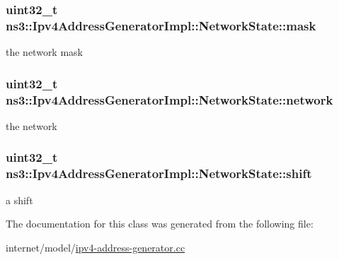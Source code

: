 \subsubsection[{\texorpdfstring{mask}{mask}}]{\setlength{\rightskip}{0pt plus 5cm}uint32\+\_\+t ns3\+::\+Ipv4\+Address\+Generator\+Impl\+::\+Network\+State\+::mask}\hypertarget{classns3_1_1Ipv4AddressGeneratorImpl_1_1NetworkState_af72c61673bc535c22b2dedd6afd21b4d}{}\label{classns3_1_1Ipv4AddressGeneratorImpl_1_1NetworkState_af72c61673bc535c22b2dedd6afd21b4d}


the network mask 

\subsubsection[{\texorpdfstring{network}{network}}]{\setlength{\rightskip}{0pt plus 5cm}uint32\+\_\+t ns3\+::\+Ipv4\+Address\+Generator\+Impl\+::\+Network\+State\+::network}\hypertarget{classns3_1_1Ipv4AddressGeneratorImpl_1_1NetworkState_afe15739547ef60d7ba74c3ab6b83e6f8}{}\label{classns3_1_1Ipv4AddressGeneratorImpl_1_1NetworkState_afe15739547ef60d7ba74c3ab6b83e6f8}


the network 

\subsubsection[{\texorpdfstring{shift}{shift}}]{\setlength{\rightskip}{0pt plus 5cm}uint32\+\_\+t ns3\+::\+Ipv4\+Address\+Generator\+Impl\+::\+Network\+State\+::shift}\hypertarget{classns3_1_1Ipv4AddressGeneratorImpl_1_1NetworkState_a2cc2b6173f3cb653762ea92dc986cf2c}{}\label{classns3_1_1Ipv4AddressGeneratorImpl_1_1NetworkState_a2cc2b6173f3cb653762ea92dc986cf2c}


a shift 



The documentation for this class was generated from the following file\+:\begin{DoxyCompactItemize}
\item 
internet/model/\hyperlink{ipv4-address-generator_8cc}{ipv4-\/address-\/generator.\+cc}\end{DoxyCompactItemize}
